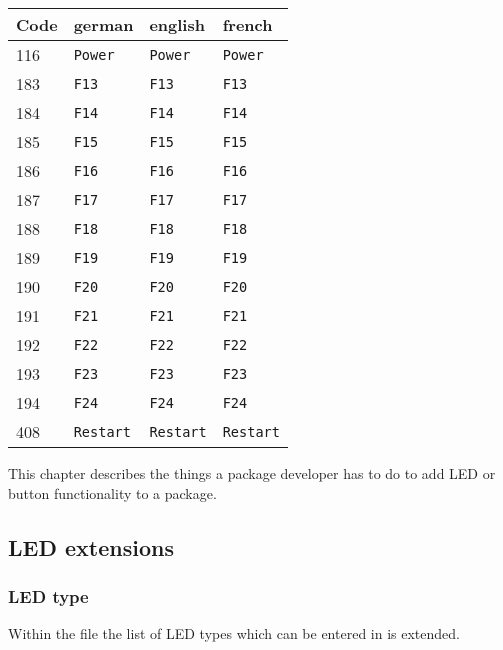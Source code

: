 \begin{longtable}{|l|l|l|l|}
  \hline
  \textbf{Code} & \textbf{german} & \textbf{english} & \textbf{french} \\
  \endhead
  \hline
  116 & \texttt{Power} & \texttt{Power} & \texttt{Power} \\ \hline
  183 & \texttt{F13} & \texttt{F13} & \texttt{F13} \\ \hline
  184 & \texttt{F14} & \texttt{F14} & \texttt{F14} \\ \hline
  185 & \texttt{F15} & \texttt{F15} & \texttt{F15} \\ \hline
  186 & \texttt{F16} & \texttt{F16} & \texttt{F16} \\ \hline
  187 & \texttt{F17} & \texttt{F17} & \texttt{F17} \\ \hline
  188 & \texttt{F18} & \texttt{F18} & \texttt{F18} \\ \hline
  189 & \texttt{F19} & \texttt{F19} & \texttt{F19} \\ \hline
  190 & \texttt{F20} & \texttt{F20} & \texttt{F20} \\ \hline
  191 & \texttt{F21} & \texttt{F21} & \texttt{F21} \\ \hline
  192 & \texttt{F22} & \texttt{F22} & \texttt{F22} \\ \hline
  193 & \texttt{F23} & \texttt{F23} & \texttt{F23} \\ \hline
  194 & \texttt{F24} & \texttt{F24} & \texttt{F24} \\ \hline
  408 & \texttt{Restart} & \texttt{Restart} & \texttt{Restart} \\ \hline
\end{longtable}

  This chapter describes the things a package developer has to do to add LED
  or button functionality to a package\footnotemark.


\subsection{LED extensions}
\subsubsection{LED type}
  Within the file  the list of LED types which can be
  entered in  is extended.

